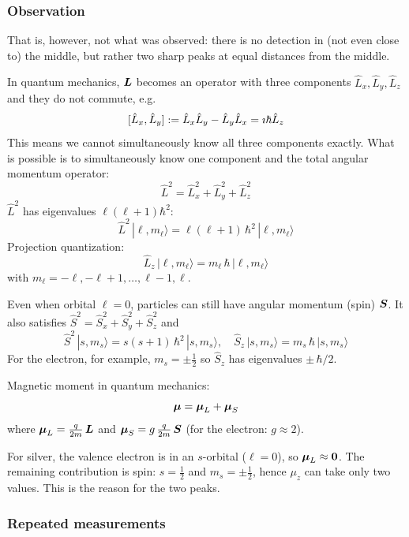 \subsubsection{Observation}

That is, however, not what was observed: there is no detection in (not even close to) the middle, but rather two sharp peaks at equal distances from the middle.

In quantum mechanics, ${\boldsymbol{L}}$ becomes an operator with three components $\hat{L}_{x},\hat{L}_{y},\hat{L}_{z}$ and they do not commute, e.g.
\[
[\hat{L}_{x},\hat{L}_{y}]
:= \hat{L}_{x}\hat{L}_{y}-\hat{L}_{y}\hat{L}_{x}
= \imath \hbar \hat{L}_{z}
\]
This means we cannot simultaneously know all three components exactly.  What is possible is to simultaneously know one component and the total angular momentum operator:
\[
\hat{L}^{2} = \hat{L}_{x}^{2}+\hat{L}_{y}^{2}+\hat{L}_{z}^{2}
\]
$\hat{L}^{2}$ has eigenvalues $\ell(\ell+1)\hbar^{2}$:
\[
\hat{L}^{2}\,|\ell,m_{\ell}\rangle = \ell(\ell+1)\,\hbar^{2}\,|\ell,m_{\ell}\rangle
\]
Projection quantization:
\[
\hat{L}_{z}\,|\ell,m_{\ell}\rangle = m_{\ell}\,\hbar\,|\ell,m_{\ell}\rangle
\]
with $m_{\ell}=-\ell,-\ell+1,\dots,\ell-1,\ell$.

Even when orbital $\ell=0$, particles can still have angular momentum (spin) ${\boldsymbol{S}}$.  It also satisfies $\hat{S}^{2} = \hat{S}_{x}^{2} + \hat{S}_{y}^{2} + \hat{S}_{z}^{2}$ and
\[
\hat{S}^{2}\,|s,m_{s}\rangle = s(s+1)\,\hbar^{2}\,|s,m_{s}\rangle,
\quad
\hat{S}_{z}\,|s,m_{s}\rangle = m_{s}\,\hbar\,|s,m_{s}\rangle
\]
For the electron, for example, $m_{s} = \pm\tfrac{1}{2}$ so $\hat{S}_{z}$ has eigenvalues $\pm\,\hbar/2$.

Magnetic moment in quantum mechanics:
\[
{\boldsymbol{\mu}} = {\boldsymbol{\mu}}_{L} + {\boldsymbol{\mu}}_{S}
\]
where
${\boldsymbol{\mu}}_{L} = \tfrac{q}{2m}\,{\boldsymbol{L}}$
and
${\boldsymbol{\mu}}_{S} = g\,\tfrac{q}{2m}\,{\boldsymbol{S}}$
(for the electron: $g \approx 2$).

For silver, the valence electron is in an $s$-orbital ($\ell=0$), so ${\boldsymbol{\mu}}_{L}\approx{\boldsymbol{0}}$.  The remaining contribution is spin: $s=\tfrac{1}{2}$ and $m_{s}=\pm\tfrac{1}{2}$, hence $\mu_{z}$ can take only two values.  This is the reason for the two peaks.

\subsubsection{Repeated measurements}

